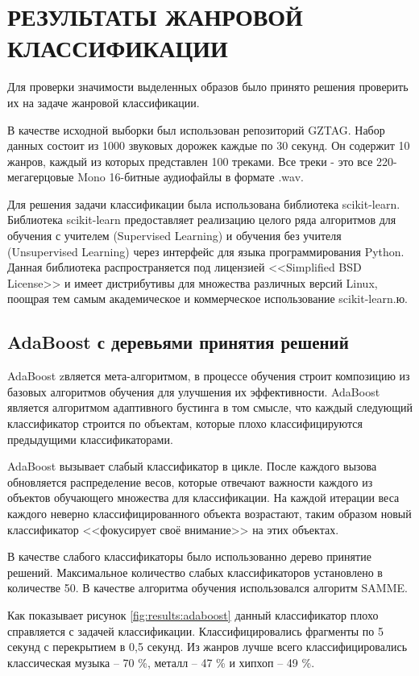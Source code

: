 \section{РЕЗУЛЬТАТЫ ЖАНРОВОЙ КЛАССИФИКАЦИИ}
\label{sec:genre_classification}


Для проверки значимости выделенных образов было принято решения проверить их на задаче жанровой классификации. 

В качестве исходной выборки был использован репозиторий GZTAG. Набор данных состоит из 1000 звуковых дорожек каждые по 30 секунд. Он содержит 10 жанров, каждый из которых представлен 100 треками. Все треки - это все 220-мегагерцовые Mono 16-битные аудиофайлы в формате .wav.


Для решения задачи классификации была использована библиотека scikit-learn. Библиотека scikit-learn предоставляет реализацию целого ряда алгоритмов для обучения с учителем (Supervised Learning) и обучения без учителя (Unsupervised Learning) через интерфейс для языка программирования Python. Данная библиотека распространяется под лицензией <<Simplified BSD License>> и имеет дистрибутивы для множества различных версий Linux, поощрая тем самым академическое и коммерческое использование scikit-learn.ю. 

\subsection{AdaBoost с деревьями принятия решений}

AdaBoost zвляется мета-алгоритмом, в процессе обучения строит композицию из базовых алгоритмов обучения для улучшения их эффективности. AdaBoost является алгоритмом адаптивного бустинга в том смысле, что каждый следующий классификатор строится по объектам, которые плохо классифицируются предыдущими классификаторами.

AdaBoost вызывает слабый классификатор в цикле. После каждого вызова обновляется распределение весов, которые отвечают важности каждого из объектов обучающего множества для классификации. На каждой итерации веса каждого неверно классифицированного объекта возрастают, таким образом новый классификатор <<фокусирует своё внимание>> на этих объектах.

В качестве слабого классификаторы было использованно дерево принятие решений. Максимальное количество слабых классификаторов установлено в количестве 50. В качестве алгоритма обучения использовался алгоритм SAMME.


Как показывает рисунок \ref{fig:results:adaboost} данный классификатор плохо справляется с задачей классификации. Классифицировались фрагменты по 5 секунд с перекрытием в 0,5 секунд. Из жанров лучше всего классифицировались классическая музыка -- 70 \%, металл -- 47 \% и хипхоп -- 49 \%. 

